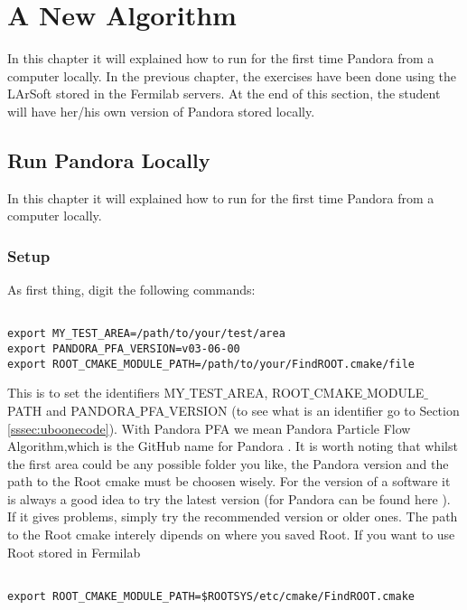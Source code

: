 	\chapter{A New Algorithm}

In this chapter it will explained how to run for the first time Pandora from a computer locally. In the previous chapter, the exercises have been done using the LArSoft stored in the Fermilab servers. At the end of this section, the student will have her/his own version of Pandora stored locally. 

	
\section{Run Pandora Locally}

In this chapter it will explained how to run for the first time Pandora from a computer locally.


\subsection{Setup} \label{sssec:setup} 

As first thing, digit the following commands:

\begin{verbatim}

export MY_TEST_AREA=/path/to/your/test/area
export PANDORA_PFA_VERSION=v03-06-00
export ROOT_CMAKE_MODULE_PATH=/path/to/your/FindROOT.cmake/file

\end{verbatim}

This is to set the identifiers MY${\_}$TEST${\_}$AREA, ROOT${\_}$CMAKE${\_}$MODULE${\_}$PATH and PANDORA${\_}$PFA${\_}$VERSION (to see what is an identifier go to Section \ref{sssec:uboonecode}). With Pandora PFA we mean Pandora Particle Flow Algorithm,which is the GitHub name for Pandora \cite{pandora_doc}. It is worth noting that whilst the first area could be any possible folder you like, the Pandora version and the path to the Root cmake must be choosen wisely. For the version of a software it is always a good idea to try the latest version (for Pandora can be found here \cite{pandora_doc}). If it gives problems, simply try the recommended version or older ones. The path to the Root cmake interely dipends on where you saved Root. If you want to use Root stored in Fermilab

\begin{verbatim}

export ROOT_CMAKE_MODULE_PATH=$ROOTSYS/etc/cmake/FindROOT.cmake

\end{verbatim}

